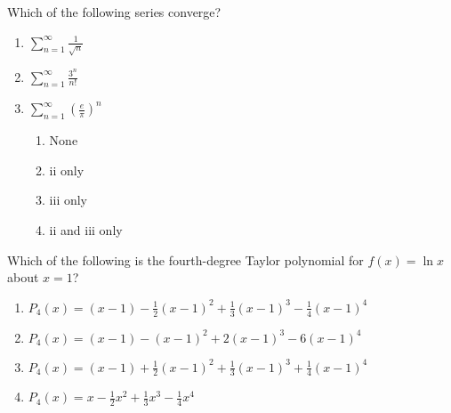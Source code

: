 \documentclass[
]{article}
\begin{document}
\begin{enumerate}
\begin{minipage}{\linewidth}
\item
  Which of the following series converge?

	\vspace{2ex}
  \begin{enumerate}
		\setlength{\itemsep}{2ex}  \def\labelenumii{\arabic{enumii}.}
    \item
    \(\displaystyle \sum_{n=1}^\infty \frac{1}{\sqrt n}\)
  \item
    \(\displaystyle \sum_{n=1}^\infty \frac{3^n}{n!}\)
  \item
    \(\displaystyle \sum_{n=1}^\infty \left(\frac{e}{\pi}\right)^n\)

    \begin{enumerate}
			\def\labelenumi{\Alph{enumi}.}
			\item
      None
    \item
      ii only
    \item
      iii only
    \item
      ii and iii only
    \end{enumerate}
  \end{enumerate}
	\vspace{0.25in}

\end{minipage}

\begin{minipage}{\linewidth}
\item
  Which of the following is the fourth-degree Taylor polynomial for
  \(f(x) = \ln x\) about \(x=1\)?
	\vspace{2ex}
  \begin{enumerate}
		\setlength{\itemsep}{2ex}
		\def\labelenumi{\Alph{enumi}.}
    \item \(P_4(x) = (x-1) - \frac12(x-1)^2 + \frac13(x-1)^3-\frac14(x-1)^4\)
  \item
    \(P_4(x) = (x-1) - (x-1)^2 + 2(x-1)^3-6(x-1)^4\)
  \item
    \(P_4(x) = (x-1) + \frac12(x-1)^2 + \frac13(x-1)^3+\frac14(x-1)^4\)
  \item
    \(P_4(x) = x - \frac12 x^2 + \frac13 x^3-\frac14 x^4\)
  \end{enumerate}
	\vspace{0.75in}

\end{minipage}

\end{enumerate}
\end{document}
